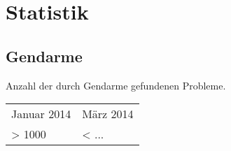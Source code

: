 %



\newpage



\section{Statistik}
\label{Abschnitt:Programmfehler:Statistik}





\subsection*{Gendarme}


Anzahl der durch Gendarme gefundenen Probleme.\\

\begin{longtable}{ll}

	  Januar 2014
	& März 2014
	
	\\
	
      > 1000
	& < ...

\end{longtable}




